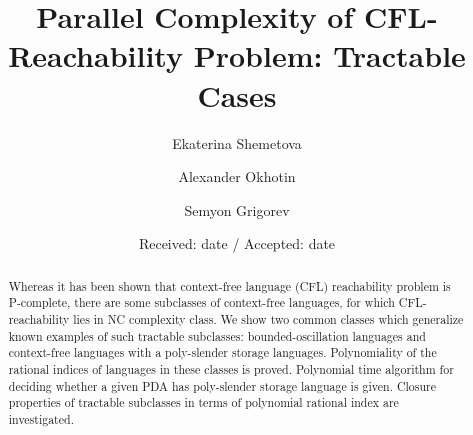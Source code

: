 \documentclass[smallextended]{svjour3}       %
\begin{document}
\title{Parallel Complexity of CFL-Reachability Problem: Tractable Cases%
}


\author{Ekaterina Shemetova         \and
         Alexander Okhotin
         \and Semyon Grigorev %
}



\date{Received: date / Accepted: date}


\maketitle

\begin{abstract}
Whereas it has been shown that  context-free language (CFL) reachability problem is P-complete, there are some subclasses of context-free languages, for which CFL-reachability lies in NC complexity class. We show two common classes which generalize known examples of such tractable subclasses: bounded-oscillation languages and context-free languages with a poly-slender storage languages. Polynomiality of the rational indices of languages in these classes is proved. Polynomial time algorithm for deciding whether a given PDA has poly-slender storage language is given. Closure properties of tractable subclasses in terms of polynomial rational index are investigated. 




\end{abstract}
\end{document}
